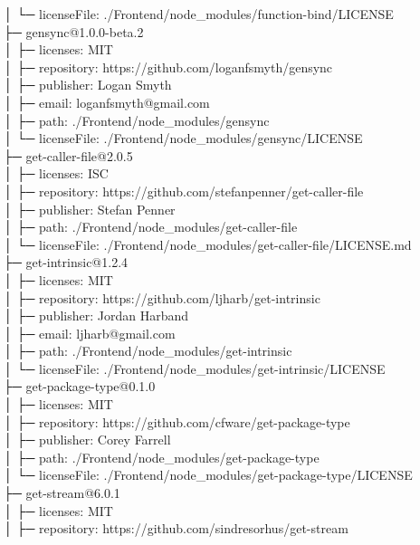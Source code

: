 \documentclass[
    paper=a4,
    twoside=false,
    parskip=half,
    listof=entryprefix,
    listof=totoc,
    index=totoc,
    bibliography=totoc,
    headsepline,
]{scrbook}
\begin{document}
    │  └─ licenseFile: ./Frontend/node\_modules/function-bind/LICENSE\\
    ├─ gensync@1.0.0-beta.2\\
    │  ├─ licenses: MIT\\
    │  ├─ repository: https://github.com/loganfsmyth/gensync\\
    │  ├─ publisher: Logan Smyth\\
    │  ├─ email: loganfsmyth@gmail.com\\
    │  ├─ path: ./Frontend/node\_modules/gensync\\
    │  └─ licenseFile: ./Frontend/node\_modules/gensync/LICENSE\\
    ├─ get-caller-file@2.0.5\\
    │  ├─ licenses: ISC\\
    │  ├─ repository: https://github.com/stefanpenner/get-caller-file\\
    │  ├─ publisher: Stefan Penner\\
    │  ├─ path: ./Frontend/node\_modules/get-caller-file\\
    │  └─ licenseFile: ./Frontend/node\_modules/get-caller-file/LICENSE.md\\
    ├─ get-intrinsic@1.2.4\\
    │  ├─ licenses: MIT\\
    │  ├─ repository: https://github.com/ljharb/get-intrinsic\\
    │  ├─ publisher: Jordan Harband\\
    │  ├─ email: ljharb@gmail.com\\
    │  ├─ path: ./Frontend/node\_modules/get-intrinsic\\
    │  └─ licenseFile: ./Frontend/node\_modules/get-intrinsic/LICENSE\\
    ├─ get-package-type@0.1.0\\
    │  ├─ licenses: MIT\\
    │  ├─ repository: https://github.com/cfware/get-package-type\\
    │  ├─ publisher: Corey Farrell\\
    │  ├─ path: ./Frontend/node\_modules/get-package-type\\
    │  └─ licenseFile: ./Frontend/node\_modules/get-package-type/LICENSE\\
    ├─ get-stream@6.0.1\\
    │  ├─ licenses: MIT\\
    │  ├─ repository: https://github.com/sindresorhus/get-stream\\
\end{document}
